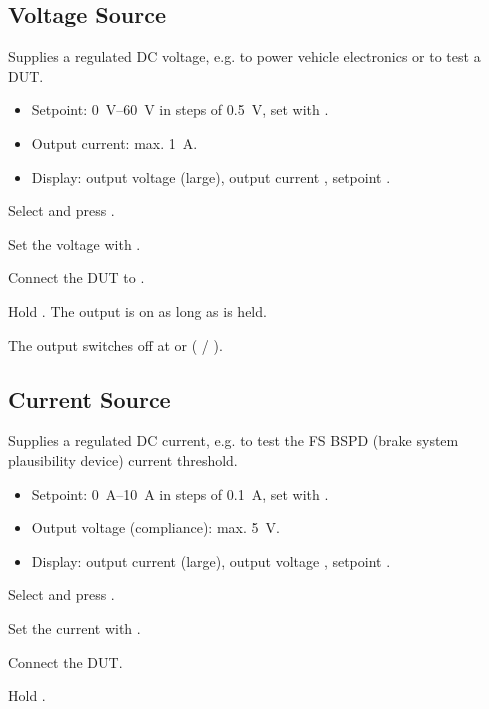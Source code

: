 \subsection{Voltage Source}
\label{sec:mode_vsrc}
Supplies a regulated DC voltage, e.g. to power vehicle electronics or to test a \ac{DUT}.
\begin{itemize}
    \item Setpoint: \qtyrange{0}{60}{\volt} in steps of \qty{0.5}{\volt}, set with \enc.
    \item Output current: max. \qty{1}{\ampere}.
    \item Display: output voltage (large), output current , setpoint .
\end{itemize}
\begin{steps}
    \item Select  and press .
    \item Set the voltage with \enc.
    \item Connect the \ac{DUT} to .
    \item Hold . The output is on as long as  is held.
\end{steps}
\begin{caution}
    The output switches off at  or  ( / ).
\end{caution}

\subsection{Current Source}
\label{sec:mode_isrc}
Supplies a regulated DC current, e.g. to test the \ac{FS} BSPD (brake system plausibility device)
current threshold.
\begin{itemize}
    \item Setpoint: \qtyrange{0}{10}{\ampere} in steps of \qty{0.1}{\ampere}, set with \enc.
    \item Output voltage (compliance): max. \qty{5}{\volt}.
    \item Display: output current (large), output voltage , setpoint .
\end{itemize}
\begin{steps}
    \item Select  and press .
    \item Set the current with \enc.
    \item Connect the \ac{DUT}.
    \item Hold .
\end{steps}

